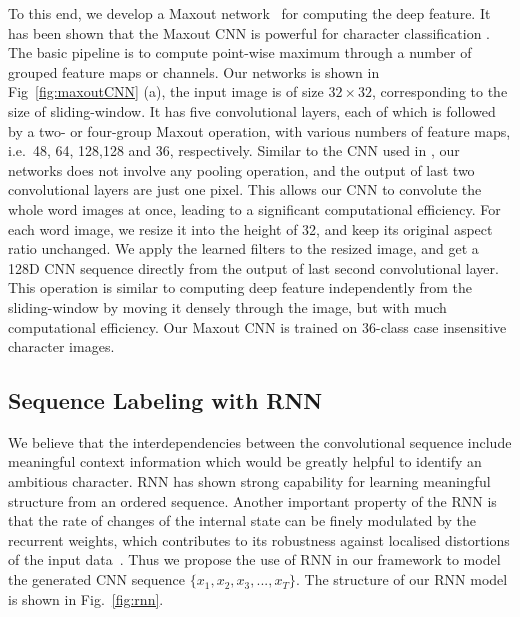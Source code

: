 \documentclass[letterpaper]{article}
\begin{document}
To this end, we develop a Maxout network~\cite{Goodfellow2013} for computing the deep feature. It has been shown that the Maxout CNN is powerful for character classification \cite{Jaderberg2014,Alsharif2013}. The basic pipeline is to compute point-wise maximum through a number of grouped feature maps or channels. Our networks is shown in Fig~\ref{fig:maxoutCNN} (a), the input image is of size $32 \times 32$, corresponding to the size of sliding-window. It has five convolutional layers, each of which is followed by a two- or four-group Maxout operation, with various numbers of feature maps, i.e.\ 48, 64, 128,128 and 36, respectively. Similar to the CNN used in \cite{Jaderberg2014}, our networks does not involve any pooling operation, and the output of last two convolutional layers are just one pixel. This allows our CNN to convolute the whole word images at once, leading to a significant computational efficiency. For each word image, we resize it into the  height of 32, and keep its original aspect ratio unchanged. We apply the learned filters to the resized image, and get a 128D CNN sequence directly from the output of last second convolutional layer. This operation is similar to computing deep feature independently from the sliding-window by moving it densely through the image, but with much computational efficiency. Our Maxout CNN is trained on 36-class case insensitive character images.




\subsection{Sequence Labeling with RNN}
We believe that the interdependencies between the convolutional sequence include meaningful context information which would be greatly helpful to identify an ambitious character.
%
RNN has shown strong capability for learning meaningful structure from an ordered sequence.
%
Another important property of the RNN is that the rate of changes of the internal state can be finely modulated by the recurrent weights, which contributes to its robustness against localised distortions of the input data~\cite{Graves2009}.
%
Thus we propose the use of RNN in our framework to model the generated CNN sequence $\{x_1, x_2, x_3,...,x_T\}$. The structure of our RNN model is shown in Fig.~\ref{fig:rnn}.
\end{document}
